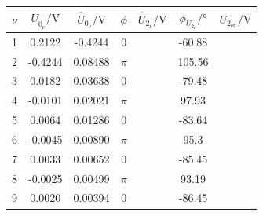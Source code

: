 \documentclass[a4paper, 12pt]{article}
\begin{document}
      \begin{table}[H]
        \begin{center}
        \begin{tabular}{@{}ccccccc@{}}
        \toprule
        $\nu$ & $\underline{U}_{0_\nu} / \si{\volt}$ & $\hat{U}_{0_\nu}/ \si{\volt}$ & $\phi$ & $\hat{U}_{2_\nu}/ \si{\volt}$ & $\phi_{U_{2_\nu}}/ \si{\degree}$ & $U_{2_{\text{eff}}}/ \si{\volt}$ \\ \midrule
                1     & 0.2122                              & -0.4244                       & 0      &                               & -60.88                           &                                  \\
        2     & -0.4244                             & 0.08488                       & $\pi$  &                               & 105.56                           &                                  \\
        3     & 0.0182                              & 0.03638                       & 0      &                               & -79.48                           &                                  \\
        4     & -0.0101                             & 0.02021                       & $\pi$  &                               & 97.93                            &                                  \\
        5     & 0.0064                              & 0.01286                       & 0      &                               & -83.64                           &                                  \\
        6     & -0.0045                             & 0.00890                       & $\pi$  &                               & 95.3                             &                                  \\
        7     & 0.0033                              & 0.00652                       & 0      &                               & -85.45                           &                                  \\
        8     & -0.0025                             & 0.00499                       & $\pi$  &                               & 93.19                            &                                  \\
        9     & 0.0020                              & 0.00394                       & 0      &                               & -86.45                           &                                  \\

\end{tabular}
\end{center}
\end{table}
\end{document}
